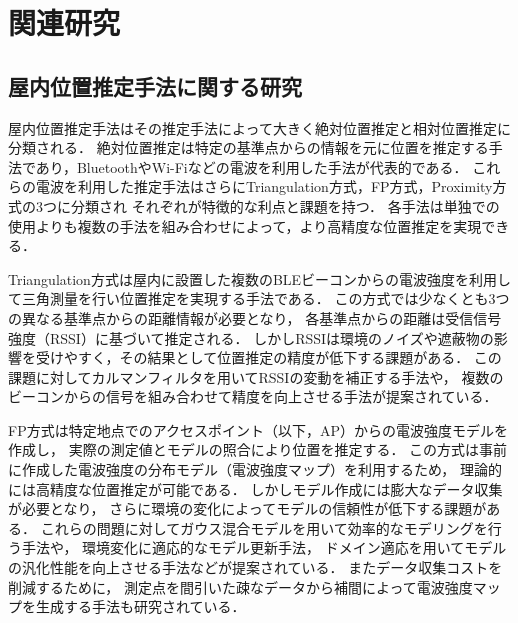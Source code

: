


\chapter{関連研究}



\section{屋内位置推定手法に関する研究}

屋内位置推定手法はその推定手法によって大きく絶対位置推定と相対位置推定に分類される．
絶対位置推定は特定の基準点からの情報を元に位置を推定する手法であり，BluetoothやWi-Fiなどの電波を利用した手法が代表的である．
これらの電波を利用した推定手法はさらにTriangulation方式，FP方式，Proximity方式の3つに分類され
それぞれが特徴的な利点と課題を持つ\cite{wireless-lan-summary}．
各手法は単独での使用よりも複数の手法を組み合わせによって，より高精度な位置推定を実現できる．

Triangulation方式は屋内に設置した複数のBLEビーコンからの電波強度を利用して三角測量を行い位置推定を実現する手法である．
この方式では少なくとも3つの異なる基準点からの距離情報が必要となり，
各基準点からの距離は受信信号強度（RSSI）に基づいて推定される\cite{ble-indoor}．
しかしRSSIは環境のノイズや遮蔽物の影響を受けやすく，その結果として位置推定の精度が低下する課題がある．
この課題に対してカルマンフィルタを用いてRSSIの変動を補正する手法\cite{triangulation-kalman}や，
複数のビーコンからの信号を組み合わせて精度を向上させる手法\cite{ble-tandem}が提案されている．

FP方式は特定地点でのアクセスポイント（以下，AP）からの電波強度モデルを作成し，
実際の測定値とモデルの照合により位置を推定する．
この方式は事前に作成した電波強度の分布モデル（電波強度マップ）を利用するため，
理論的には高精度な位置推定が可能である．
しかしモデル作成には膨大なデータ収集が必要となり，
さらに環境の変化によってモデルの信頼性が低下する課題がある．
これらの問題に対してガウス混合モデルを用いて効率的なモデリングを行う手法\cite{gaussian-mixture-model}や，
環境変化に適応的なモデル更新手法\cite{fingerprint-auto-update}，
ドメイン適応を用いてモデルの汎化性能を向上させる手法\cite{wi-fi-fingerprint-domain}などが提案されている．
またデータ収集コストを削減するために，
測定点を間引いた疎なデータから補間によって電波強度マップを生成する手法\cite{wireless-lan-cost-reduction}も研究されている．


